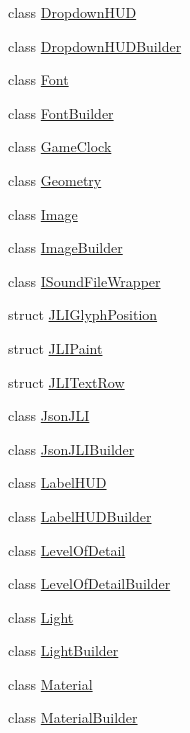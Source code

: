 \begin{DoxyCompactItemize}
\item 
class \mbox{\hyperlink{classnjli_1_1_dropdown_h_u_d}{Dropdown\+H\+UD}}
\item 
class \mbox{\hyperlink{classnjli_1_1_dropdown_h_u_d_builder}{Dropdown\+H\+U\+D\+Builder}}
\item 
class \mbox{\hyperlink{classnjli_1_1_font}{Font}}
\item 
class \mbox{\hyperlink{classnjli_1_1_font_builder}{Font\+Builder}}
\item 
class \mbox{\hyperlink{classnjli_1_1_game_clock}{Game\+Clock}}
\item 
class \mbox{\hyperlink{classnjli_1_1_geometry}{Geometry}}
\item 
class \mbox{\hyperlink{classnjli_1_1_image}{Image}}
\item 
class \mbox{\hyperlink{classnjli_1_1_image_builder}{Image\+Builder}}
\item 
class \mbox{\hyperlink{classnjli_1_1_i_sound_file_wrapper}{I\+Sound\+File\+Wrapper}}
\item 
struct \mbox{\hyperlink{structnjli_1_1_j_l_i_glyph_position}{J\+L\+I\+Glyph\+Position}}
\item 
struct \mbox{\hyperlink{structnjli_1_1_j_l_i_paint}{J\+L\+I\+Paint}}
\item 
struct \mbox{\hyperlink{structnjli_1_1_j_l_i_text_row}{J\+L\+I\+Text\+Row}}
\item 
class \mbox{\hyperlink{classnjli_1_1_json_j_l_i}{Json\+J\+LI}}
\item 
class \mbox{\hyperlink{classnjli_1_1_json_j_l_i_builder}{Json\+J\+L\+I\+Builder}}
\item 
class \mbox{\hyperlink{classnjli_1_1_label_h_u_d}{Label\+H\+UD}}
\item 
class \mbox{\hyperlink{classnjli_1_1_label_h_u_d_builder}{Label\+H\+U\+D\+Builder}}
\item 
class \mbox{\hyperlink{classnjli_1_1_level_of_detail}{Level\+Of\+Detail}}
\item 
class \mbox{\hyperlink{classnjli_1_1_level_of_detail_builder}{Level\+Of\+Detail\+Builder}}
\item 
class \mbox{\hyperlink{classnjli_1_1_light}{Light}}
\item 
class \mbox{\hyperlink{classnjli_1_1_light_builder}{Light\+Builder}}
\item 
class \mbox{\hyperlink{classnjli_1_1_material}{Material}}
\item 
class \mbox{\hyperlink{classnjli_1_1_material_builder}{Material\+Builder}}
\item 

\end{DoxyCompactItemize}
